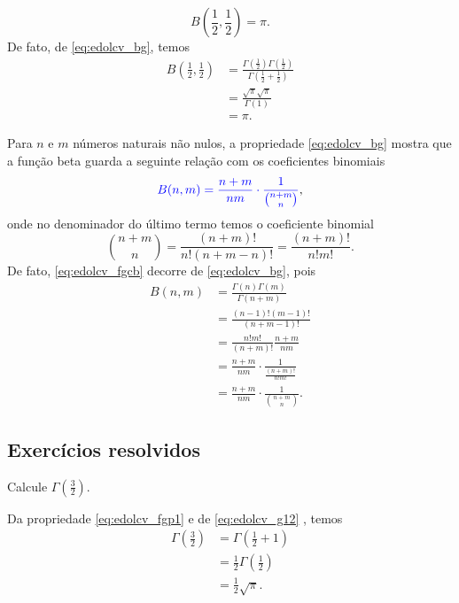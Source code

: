 \begin{ex}
  \begin{equation}
    B\left(\frac{1}{2}, \frac{1}{2}\right) = \pi.
  \end{equation}
  De fato, de \eqref{eq:edolcv_bg}, temos
  \begin{align}
    B\left(\frac{1}{2}, \frac{1}{2}\right) &= \frac{\Gamma\left(\frac{1}{2}\right)\Gamma\left(\frac{1}{2}\right)}{\Gamma\left(\frac{1}{2}+\frac{1}{2}\right)}\\
                                           &= \frac{\sqrt{\pi}\sqrt{\pi}}{\Gamma(1)}\\
                                           &= \pi.
  \end{align}
\end{ex}

Para $n$ e $m$ números naturais não nulos, a propriedade \eqref{eq:edolcv_bg} mostra que a função beta guarda a seguinte relação com os coeficientes binomiais
\begin{equation}\label{eq:edolcv_fgcb}
  {\color{blue}B(n,m) = \frac{n+m}{nm}\cdot \frac{1}{\binom{n+m}{n}}},
\end{equation}
onde no denominador do último termo temos o coeficiente binomial
\begin{equation}
  \binom{n+m}{n} = \frac{(n+m)!}{n!(n+m-n)!} = \frac{(n+m)!}{n!m!}.
\end{equation}
De fato, \eqref{eq:edolcv_fgcb} decorre de \eqref{eq:edolcv_bg}, pois
\begin{align}
  B(n,m) &= \frac{\Gamma(n)\Gamma(m)}{\Gamma(n+m)} \\
         &= \frac{(n-1)!(m-1)!}{(n+m-1)!}\\
         &= \frac{n!m!}{(n+m)!}\frac{n+m}{nm}\\
         &= \frac{n+m}{nm}\cdot\frac{1}{\frac{(n+m)!}{n!m!}}\\
         &= \frac{n+m}{nm}\cdot \frac{1}{\binom{n+m}{n}}.
\end{align}

\subsection*{Exercícios resolvidos}

\begin{exeresol}
  Calcule $\displaystyle\Gamma\left(\frac{3}{2}\right)$.
\end{exeresol}
\begin{resol}
  Da propriedade \eqref{eq:edolcv_fgp1} e de \eqref{eq:edolcv_g12} , temos
  \begin{align}
    \Gamma\left(\frac{3}{2}\right) &= \Gamma\left(\frac{1}{2}+1\right)\\
                                   &= \frac{1}{2}\Gamma\left(\frac{1}{2}\right)\\
                                   &= \frac{1}{2}\sqrt{\pi}.
  \end{align}
\end{resol}

